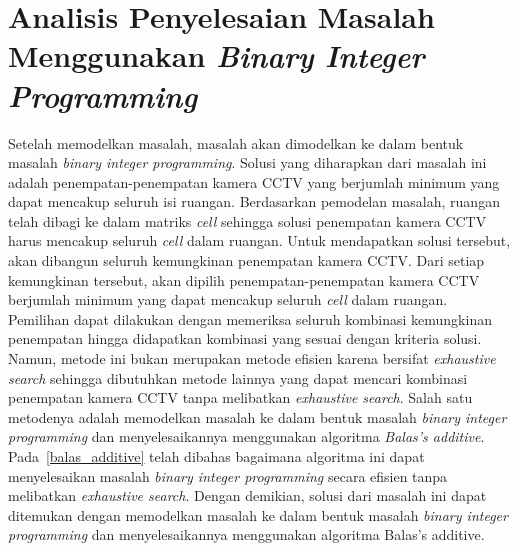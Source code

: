 \section{Analisis Penyelesaian Masalah Menggunakan \textit{Binary Integer Programming}}
Setelah memodelkan masalah, masalah akan dimodelkan ke dalam bentuk masalah \textit{binary integer programming}. Solusi yang diharapkan dari masalah ini adalah penempatan-penempatan kamera CCTV yang berjumlah minimum yang dapat mencakup seluruh isi ruangan. Berdasarkan pemodelan masalah, ruangan telah dibagi ke dalam matriks \textit{cell} sehingga solusi penempatan kamera CCTV harus mencakup seluruh \textit{cell} dalam ruangan. 
Untuk mendapatkan solusi tersebut, akan dibangun seluruh kemungkinan penempatan kamera CCTV. Dari setiap kemungkinan tersebut, akan dipilih penempatan-penempatan kamera CCTV berjumlah minimum yang dapat mencakup seluruh \textit{cell} dalam ruangan. Pemilihan dapat dilakukan dengan memeriksa seluruh kombinasi kemungkinan penempatan hingga didapatkan kombinasi yang sesuai dengan kriteria solusi. Namun, metode ini bukan merupakan metode efisien karena bersifat \textit{exhaustive search} sehingga dibutuhkan metode lainnya yang dapat mencari kombinasi penempatan kamera CCTV tanpa melibatkan \textit{exhaustive search}. Salah satu metodenya adalah memodelkan masalah ke dalam bentuk masalah \textit{binary integer programming} dan menyelesaikannya menggunakan algoritma \textit{Balas's additive}. Pada~\ref{balas_additive} telah dibahas bagaimana algoritma ini dapat menyelesaikan masalah \textit{binary integer programming} secara efisien tanpa melibatkan \textit{exhaustive search}. Dengan demikian, solusi dari masalah ini dapat ditemukan dengan memodelkan masalah ke dalam bentuk masalah \textit{binary integer programming} dan menyelesaikannya menggunakan algoritma Balas's additive.


